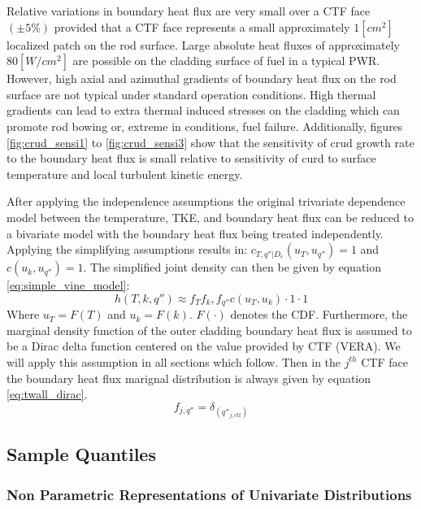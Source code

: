 Relative variations in boundary heat flux are very small over a CTF face $(\pm 5\%)$ provided that a CTF face represents a small approximately $1 [cm^2]$ localized patch on the rod surface.  Large absolute heat fluxes of approximately $80 [W/cm^2]$ are possible on the cladding surface of fuel in a typical PWR.  However, high axial and azimuthal gradients of boundary heat flux on the rod surface are not typical under standard operation conditions.  High thermal gradients can lead to extra thermal induced stresses on the cladding which can promote rod bowing or, extreme in conditions, fuel failure.
Additionally, figures \ref{fig:crud_sensi1} to \ref{fig:crud_sensi3} show that the sensitivity of crud growth rate to the boundary heat flux is small relative to sensitivity of curd to surface temperature and local turbulent kinetic energy.


After applying the independence assumptions the original trivariate dependence model between the temperature, TKE, and boundary heat flux can be reduced to a bivariate model with the boundary heat flux being treated independently.  Applying the simplifying assumptions results in: $c_{T,q''|D_e}(u_T, u_{q''}) = 1$ and $c(u_{k}, u_{q''}) = 1$. The simplified joint density can then be given by equation \ref{eq:simple_vine_model}:
\begin{equation}
h(T, k, q'') \approx  f_T f_k, f_{q''} c(u_{T}, u_{k})  \cdot 1 \cdot 1
\label{eq:simple_vine_model}
\end{equation}
Where $u_T=F(T)$ and $u_k = F(k)$. $F(\cdot)$ denotes the CDF.
Furthermore, the marginal density function of the outer cladding boundary heat flux is assumed to be a Dirac delta function centered on the value provided by CTF (VERA).  We will apply this assumption in all sections which follow.
Then in the $j^{th}$ CTF face the boundary heat flux marignal distribution is always given by equation \ref{eq:twall_dirac}.
\begin{equation}
f_{j,q''} = \delta_{(q''_{j, \mathrm{ctf}})}
\label{eq:twall_dirac}
\end{equation}





\subsection{Sample Quantiles}

\subsubsection{Non Parametric Representations of Univariate Distributions}

